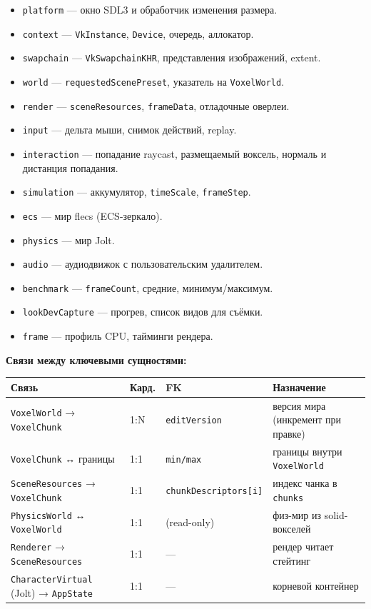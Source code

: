 \begin{itemize}
\tightlist
\item
  \texttt{platform} --- окно SDL3 и обработчик изменения размера.
\item
  \texttt{context} --- \texttt{VkInstance}, \texttt{Device}, очередь, аллокатор.
\item
  \texttt{swapchain} --- \texttt{VkSwapchainKHR}, представления изображений, extent.
\item
  \texttt{world} --- \texttt{requestedScenePreset}, указатель на \texttt{VoxelWorld}.
\item
  \texttt{render} --- \texttt{sceneResources}, \texttt{frameData}, отладочные оверлеи.
\item
  \texttt{input} --- дельта мыши, снимок действий, replay.
\item
  \texttt{interaction} --- попадание raycast, размещаемый воксель, нормаль и дистанция попадания.
\item
  \texttt{simulation} --- аккумулятор, \texttt{timeScale}, \texttt{frameStep}.
\item
  \texttt{ecs} --- мир flecs (ECS-зеркало).
\item
  \texttt{physics} --- мир Jolt.
\item
  \texttt{audio} --- аудиодвижок с пользовательским удалителем.
\item
  \texttt{benchmark} --- \texttt{frameCount}, средние, минимум/максимум.
\item
  \texttt{lookDevCapture} --- прогрев, список видов для съёмки.
\item
  \texttt{frame} --- профиль CPU, тайминги рендера.
\end{itemize}

\textbf{Связи между ключевыми сущностями:}

\begin{longtable}[]{@{}llll@{}}
\toprule\noalign{}
Связь & Кард. & FK & Назначение \\
\midrule\noalign{}
\endhead
\bottomrule\noalign{}
\endlastfoot
\texttt{VoxelWorld} → \texttt{VoxelChunk} & 1:N & \texttt{editVersion} & версия мира (инкремент при правке) \\
\texttt{VoxelChunk} ↔ границы & 1:1 & \texttt{min/max} & границы внутри \texttt{VoxelWorld} \\
\texttt{SceneResources} → \texttt{VoxelChunk} & 1:1 & \texttt{chunkDescriptors{[}i{]}} & индекс чанка в \texttt{chunks} \\
\texttt{PhysicsWorld} ↔ \texttt{VoxelWorld} & 1:1 & (read-only) & физ-мир из solid-вокселей \\
\texttt{Renderer} → \texttt{SceneResources} & 1:1 & --- & рендер читает стейтинг \\
\texttt{CharacterVirtual} (Jolt) → \texttt{AppState} & 1:1 & --- & корневой контейнер \\
\end{longtable}

